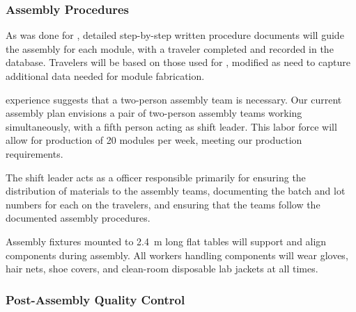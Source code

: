 
\subsubsection{Assembly Procedures}


As was done for , detailed step-by-step written procedure documents will %
guide the assembly for each  module, with a  traveler %
completed and recorded in the database.  Travelers will be based on those used for , modified as need to capture additional data needed for  module fabrication.

 experience suggests that a two-person assembly team is necessary.
Our current assembly plan envisions a pair of two-person assembly teams working simultaneously, with a fifth person acting as shift leader.  This labor force will allow for production of \num{20}  modules per week, meeting our production requirements.  

The shift leader acts as a  officer responsible primarily for ensuring the distribution of materials to the assembly teams, documenting the batch and lot numbers for each  on the travelers, and ensuring that the teams follow the documented assembly procedures.

Assembly fixtures mounted to \SI{2.4}{m} long flat tables will %
support and align  components during assembly.  All workers handling  components will wear gloves, hair nets, shoe covers, and clean-room disposable lab jackets at all times.

\subsubsection{Post-Assembly Quality Control}

